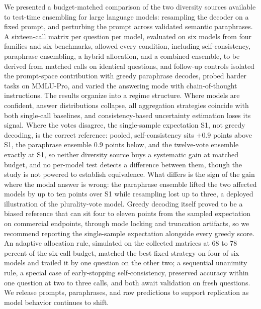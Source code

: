 \documentclass[preprint,12pt]{elsarticle}
\begin{document}
We presented a budget-matched comparison of the two diversity sources available to test-time ensembling for large language models: resampling the decoder on a fixed prompt, and perturbing the prompt across validated semantic paraphrases. A sixteen-call matrix per question per model, evaluated on six models from four families and six benchmarks, allowed every condition, including self-consistency, paraphrase ensembling, a hybrid allocation, and a combined ensemble, to be derived from matched calls on identical questions, and follow-up controls isolated the prompt-space contribution with greedy paraphrase decodes, probed harder tasks on MMLU-Pro, and varied the answering mode with chain-of-thought instructions. The results organize into a regime structure. Where models are confident, answer distributions collapse, all aggregation strategies coincide with both single-call baselines, and consistency-based uncertainty estimation loses its signal. Where the votes disagree, the single-sample expectation S1, not greedy decoding, is the correct reference: pooled, self-consistency sits $+0.9$ points above S1, the paraphrase ensemble $0.9$ points below, and the twelve-vote ensemble exactly at S1, so neither diversity source buys a systematic gain at matched budget, and no per-model test detects a difference between them, though the study is not powered to establish equivalence. What differs is the sign of the gain where the modal answer is wrong: the paraphrase ensemble lifted the two affected models by up to ten points over S1 while resampling lost up to three, a deployed illustration of the plurality-vote model. Greedy decoding itself proved to be a biased reference that can sit four to eleven points from the sampled expectation on commercial endpoints, through mode locking and truncation artifacts, so we recommend reporting the single-sample expectation alongside every greedy score. An adaptive allocation rule, simulated on the collected matrices at 68 to 78 percent of the six-call budget, matched the best fixed strategy on four of six models and trailed it by one question on the other two; a sequential unanimity rule, a special case of early-stopping self-consistency, preserved accuracy within one question at two to three calls, and both await validation on fresh questions. We release prompts, paraphrases, and raw predictions to support replication as model behavior continues to shift.
\end{document}
